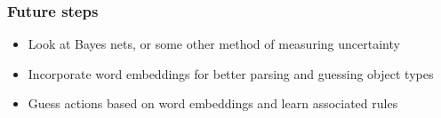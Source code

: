\begin{frame}
    \frametitle{Future steps}

    \begin{itemize}
        \item Look at Bayes nets, or some other method of measuring
            uncertainty
        \item Incorporate word embeddings for better parsing and
            guessing object types
        \item Guess actions based on word embeddings and learn
            associated rules
    \end{itemize}
\end{frame}
